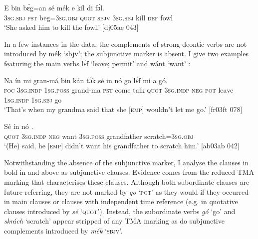\ea%
    \label{ex:key:1402}
    \gll E    bin  bɛ́g=an    sé    mék    e    kíl  di  fɔ́l.\\
\textsc{3sg.sbj}  \textsc{pst}  beg=\textsc{3sg.obj}  \textsc{quot}    \textsc{sbjv}    \textsc{3sg.sbj}  kill  \textsc{def}  fowl\\

\glt ‘She asked him to kill the fowl.’ [dj05ae 043]
\z

In a few instances in the data, the complements of strong deontic verbs are not introduced by mék ‘sbjv’; the subjunctive marker is absent. I give two examples featuring the main verbs lɛ́f ‘leave; permit’  and wánt ‘want’ : 


\ea%
    \label{ex:key:1403}
    \gll Na  ín    mi    gran-má    bin  kán    tɔ́k  sé
in    nó  go  lɛ́f    mi    a    gó.\\
\textsc{foc}  \textsc{3sg.indp}  \textsc{1sg.poss}  grand-ma  \textsc{pst}  come  talk  \textsc{quot}
\textsc{3sg.indp}  \textsc{neg}  \textsc{pot}  leave  \textsc{1sg.indp}  \textsc{1sg.sbj}  go\\

\glt ‘That’s when my grandma said that she [\textsc{emp}] wouldn’t let me go.’ [fr03ft 078]
\z


\ea%
    \label{ex:key:1404}
    \gll Sé    ín    nó            .\\
\textsc{quot}    \textsc{3sg.indp}  \textsc{neg}  want  \textsc{3sg.poss}  grandfather  scratch=\textsc{3sg.obj}\\

\glt ‘(He) said, he [\textsc{emp}] didn’t want his grandfather to scratch him.’ [ab03ab 042]
\z

Notwithstanding the absence of the subjunctive marker, I analyse the clauses in bold in  and  above as subjunctive clauses. Evidence comes from the reduced TMA marking that characterises these clauses. Although both subordinate clauses are future-referring, they are not marked by \textit{go} ‘\textsc{pot}’ as they would if they occurred in main clauses or clauses with independent time reference (e.g. in quotative clauses introduced by \textit{sé} ‘\textsc{quot}’). Instead, the subordinate verbs \textit{gó} ‘go’ and \textit{skrách} ‘scratch’ appear stripped of any TMA marking as do subjunctive complements introduced by \textit{mék} ‘\textsc{sbjv}’. 


